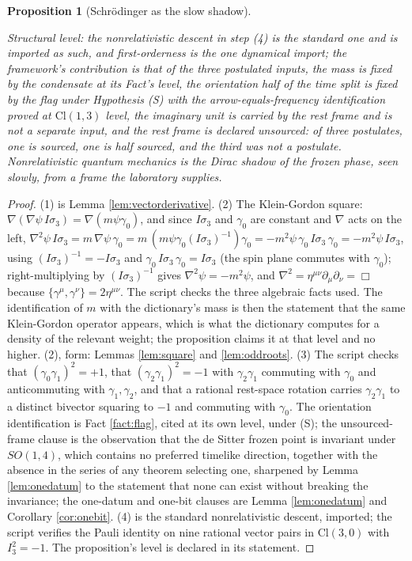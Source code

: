 \documentclass[11pt]{article}
\newtheorem{proposition}[theorem]{Proposition}
\theoremstyle{definition}
\newcommand{\Cl}{\mathrm{Cl}}
\begin{document}
\begin{proposition}[Schr\"odinger as the slow shadow]
\begin{enumerate}
\end{enumerate}
Structural level: the nonrelativistic descent in step (4) is the standard one and is imported as such, and first-orderness is the one dynamical import; the framework's contribution is that of the three postulated inputs, the mass is fixed by the condensate at its Fact's level, the orientation half of the time split is fixed by the flag under Hypothesis (S) with the arrow-equals-frequency identification proved at $\Cl(1,3)$ level, the imaginary unit is carried by the rest frame and is not a separate input, and the rest frame is declared unsourced: of three postulates, one is sourced, one is half sourced, and the third was not a postulate. Nonrelativistic quantum mechanics is the Dirac shadow of the frozen phase, seen slowly, from a frame the laboratory supplies.
\end{proposition}

\begin{proof}
(1) is Lemma \ref{lem:vectorderivative}. (2) The Klein-Gordon square: $\nabla(\nabla\psi\,I\sigma_{3}) = \nabla(m\psi\gamma_{0})$, and since $I\sigma_{3}$ and $\gamma_{0}$ are constant and $\nabla$ acts on the left, $\nabla^{2}\psi\, I\sigma_{3} = m\,\nabla\psi\,\gamma_{0} = m\,(m\psi\gamma_{0}(I\sigma_{3})^{-1})\gamma_{0} = -m^{2}\psi\,\gamma_{0}\,I\sigma_{3}\,\gamma_{0} = -m^{2}\psi\, I\sigma_{3}$, using $(I\sigma_{3})^{-1} = -I\sigma_{3}$ and $\gamma_{0}\,I\sigma_{3}\,\gamma_{0} = I\sigma_{3}$ (the spin plane commutes with $\gamma_{0}$); right-multiplying by $(I\sigma_{3})^{-1}$ gives $\nabla^{2}\psi = -m^{2}\psi$, and $\nabla^{2} = \eta^{\mu\nu}\partial_{\mu}\partial_{\nu} = \Box$ because $\{\gamma^{\mu}, \gamma^{\nu}\} = 2\eta^{\mu\nu}$. The script checks the three algebraic facts used. The identification of $m$ with the dictionary's mass is then the statement that the same Klein-Gordon operator appears, which is what the dictionary computes for a density of the relevant weight; the proposition claims it at that level and no higher. (2), form: Lemmas \ref{lem:square} and \ref{lem:oddroots}. (3) The script checks that $(\gamma_{0}\gamma_{1})^{2} = +1$, that $(\gamma_{2}\gamma_{1})^{2} = -1$ with $\gamma_{2}\gamma_{1}$ commuting with $\gamma_{0}$ and anticommuting with $\gamma_{1}, \gamma_{2}$, and that a rational rest-space rotation carries $\gamma_{2}\gamma_{1}$ to a distinct bivector squaring to $-1$ and commuting with $\gamma_{0}$. The orientation identification is Fact \ref{fact:flag}, cited at its own level, under (S); the unsourced-frame clause is the observation that the de Sitter frozen point is invariant under $SO(1,4)$, which contains no preferred timelike direction, together with the absence in the series of any theorem selecting one, sharpened by Lemma \ref{lem:onedatum} to the statement that none can exist without breaking the invariance; the one-datum and one-bit clauses are Lemma \ref{lem:onedatum} and Corollary \ref{cor:onebit}. (4) is the standard nonrelativistic descent, imported; the script verifies the Pauli identity on nine rational vector pairs in $\Cl(3,0)$ with $I_{3}^{2} = -1$. The proposition's level is declared in its statement.
\end{proof}
\end{document}
